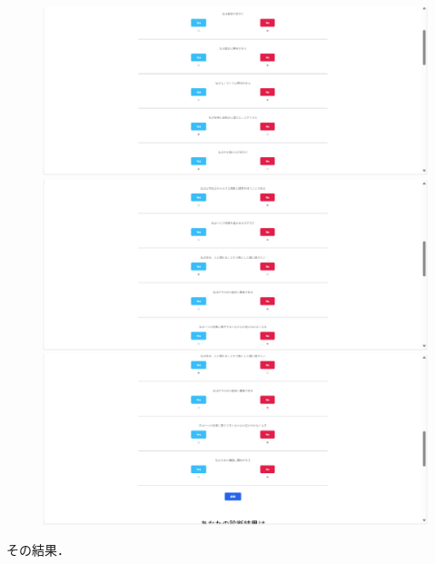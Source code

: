 \documentclass[a4j, titlepage]{jarticle}
\begin{document}
\begin{figure}[htbp]
  \centering
\includegraphics[scale=0.12]{dousakekka-9.png}
\includegraphics[scale=0.12]{dousakekka-10.png}
\includegraphics[scale=0.12]{dousakekka-11.png}
\end{figure}

その結果．
\end{document}
